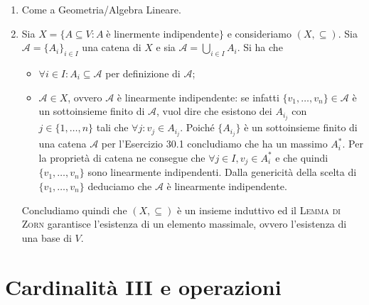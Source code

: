 \documentclass[a4paper]{article}\par \usepackage{style}\par
\begin{document}
\begin{enumerate}
\item Come a Geometria/Algebra Lineare.
\item Sia $ X = \{A \subseteq V : A \; \text{è linermente indipendente}\} $ e consideriamo $ (X, \subseteq) $. Sia $ \mathscr{A} = \{A_i\}_{i \in I} $ una catena di $ X $ e sia $ \mathcal{A} = \bigcup_{i \in I} A_i $. Si ha che
  \begin{itemize}
  \item $ \forall i \in I : A_i \subseteq \mathcal{A} $ per definizione di $ \mathcal{A} $;
  \item $ \mathcal{A} \in X $, ovvero $ \mathcal{A} $ è linearmente indipendente: se infatti $ \{v_1, \dots, v_n\} \in \mathcal{A} $ è un sottoinsieme finito di $ \mathcal{A} $, vuol dire che esistono dei $ A_{i_j} $ con $ j \in \{1, \dots, n\} $ tali che $ \forall j : v_j \in A_{i_j} $. Poiché $ \{A_{i_j}\} $ è un sottoinsieme finito di una catena $ \mathscr{A} $ per l'Esercizio 30.1 concludiamo che ha un massimo $ A_i^{*} $. Per la proprietà di catena ne consegue che $ \forall j \in I, v_j \in A_i^{*} $ e che quindi $ \{v_1, \dots, v_n\} $ sono linearmente indipendenti. Dalla genericità della scelta di $ \{v_1, \dots, v_n\} $ deduciamo che $ \mathcal{A} $ è linearmente indipendente.
  \end{itemize}
  Concludiamo quindi che $ (X, \subseteq) $ è un insieme induttivo ed il \textsc{Lemma di Zorn} garantisce l'esistenza di un elemento massimale, ovvero l'esistenza di una base di $ V $.
\end{enumerate}\par \section{Cardinalità III e operazioni}
\end{document}
